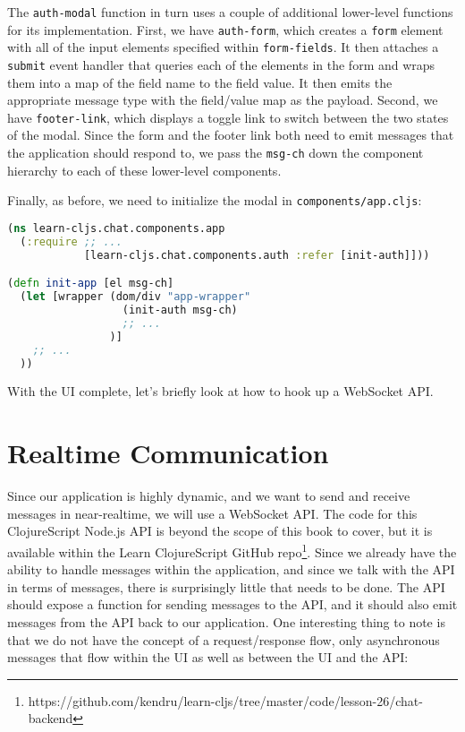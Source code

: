\documentclass[10pt,twoside,openright]{memoir}
\begin{document}
The \texttt{auth-modal} function in turn uses a couple of additional
lower-level functions for its implementation. First, we have
\texttt{auth-form}, which creates a \texttt{form} element with all of
the input elements specified within \texttt{form-fields}. It then
attaches a \texttt{submit} event handler that queries each of the
elements in the form and wraps them into a map of the field name to the
field value. It then emits the appropriate message type with the
field/value map as the payload. Second, we have \texttt{footer-link},
which displays a toggle link to switch between the two states of the
modal. Since the form and the footer link both need to emit messages
that the application should respond to, we pass the \texttt{msg-ch} down
the component hierarchy to each of these lower-level components.

Finally, as before, we need to initialize the modal in
\texttt{components/app.cljs}:

\begin{lstlisting}[language=Clojure]
(ns learn-cljs.chat.components.app
  (:require ;; ...
            [learn-cljs.chat.components.auth :refer [init-auth]]))

(defn init-app [el msg-ch]
  (let [wrapper (dom/div "app-wrapper"
                  (init-auth msg-ch)
                  ;; ...
                )]
    ;; ...
  ))
\end{lstlisting}

With the UI complete, let's briefly look at how to hook up a WebSocket
API.


\section{Realtime Communication}

Since our application is highly dynamic, and we want to send and receive
messages in near-realtime, we will use a WebSocket API. The code for
this ClojureScript Node.js API is beyond the scope of this book to
cover, but it is available within the Learn ClojureScript GitHub repo\footnote{https://github.com/kendru/learn-cljs/tree/master/code/lesson-26/chat-backend}.
Since we already have the ability to
handle messages within the application, and since we talk with the API
in terms of messages, there is surprisingly little that needs to be
done. The API should expose a function for sending messages to the API,
and it should also emit messages from the API back to our application.
One interesting thing to note is that we do not have the concept of a
request/response flow, only asynchronous messages that flow within the
UI as well as between the UI and the API:
\end{document}
